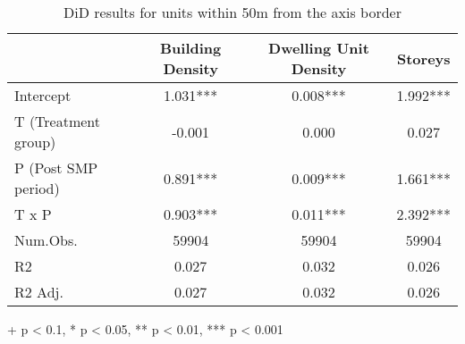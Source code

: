 \begin{table}[h]
  \centering
\caption{DiD results for units within 50m from the axis border} 
\fontsize{10pt}{12pt}\selectfont
\begin{tabular*}{.85\linewidth}{@{\extracolsep{\fill}}lccc}
\toprule
  & Building Density & Dwelling Unit Density & Storeys \\ 
\midrule\addlinespace[2.5pt]
Intercept & 1.031*** & 0.008*** & 1.992*** \\ 
T (Treatment group) & -0.001 & 0.000 & 0.027 \\ 
P (Post SMP period) & 0.891*** & 0.009*** & 1.661*** \\ 
{T x P} & {0.903***} & {0.011***} & {2.392***} \\ 
\midrule
Num.Obs. & 59904 & 59904 & 59904 \\ 
R2 & 0.027 & 0.032 & 0.026 \\ 
R2 Adj. & 0.027 & 0.032 & 0.026 \\ 
\bottomrule
\end{tabular*}
\begin{minipage}{.85\linewidth}
+ p < 0.1, * p < 0.05, ** p < 0.01, *** p < 0.001\\
\end{minipage}
\label{tab:did-IPTU}
\end{table}

